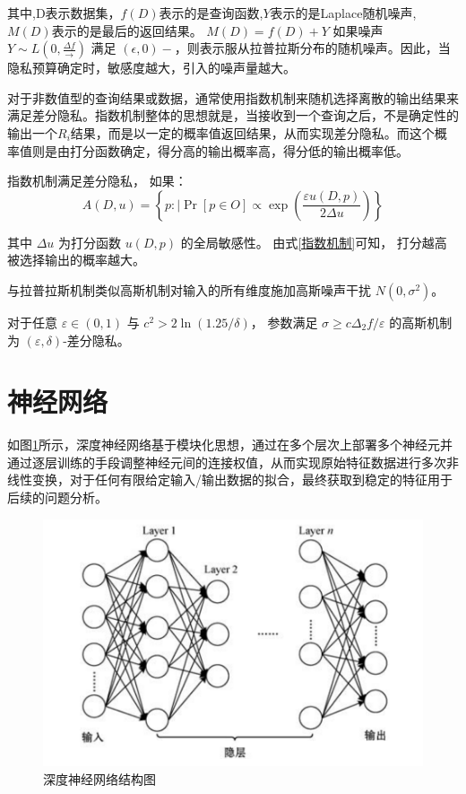 其中,D表示数据集，$f(D)$表示的是查询函数,$Y$表示的是Laplace随机噪声,$M(D)$表示的是最后的返回结果。
$M(D)=f(D)+Y$
如果噪声 $Y \sim L\left(0,\frac{\Delta f}{\longrightarrow}\right)$ 满足 $(\epsilon,0)-$，则表示服从拉普拉斯分布的随机噪声。因此，当隐私预算确定时，敏感度越大，引入的噪声量越大。

对于非数值型的查询结果或数据，通常使用指数机制来随机选择离散的输出结果来满足差分隐私。指数机制整体的思想就是，当接收到一个查询之后，不是确定性的输出一个$R_{i}$结果，而是以一定的概率值返回结果，从而实现差分隐私。而这个概率值则是由打分函数确定，得分高的输出概率高，得分低的输出概率低。

\begin{theorem}[指数机制]\label{指数机制}
指数机制满足差分隐私， 如果：
$$
A(D,u)=\left\{p: \mid \operatorname{Pr}[p \in O] \propto \exp \left(\frac{\varepsilon u(D,p)}{2 \Delta u}\right)\right\}
$$
\end{theorem}
其中 $\Delta u$ 为打分函数 $u(D,p)$ 的全局敏感性。 由式\ref{指数机制}可知， 打分越高被选择输出的概率越大。\cite{53}

与拉普拉斯机制类似高斯机制对输入的所有维度施加高斯噪声干扰 $N\left(0,\sigma^{2}\right)$。
\begin{theorem}[高斯机制]\label{高斯机制}
对于任意 $\varepsilon \in(0,1)$ 与 $c^{2}>2 \ln (1.25 / \delta)$， 参数满足 $\sigma \geq c \Delta_{2} f / \varepsilon$ 的高斯机制为 $(\varepsilon,\delta)$-差分隐私。
\end{theorem}

\section{神经网络}
如图\ref{fig:深度神经网络结构图}所示，深度神经网络基于模块化思想，通过在多个层次上部署多个神经元并通过逐层训练的手段调整神经元间的连接权值，从而实现原始特征数据进行多次非线性变换，对于任何有限给定输入/输出数据的拟合，最终获取到稳定的特征用于后续的问题分析。
\begin{figure}[!hbt]
\centering
	\includegraphics[scale=0.7]{fig2/C2/深度神经网络结构图}%
	\caption{深度神经网络结构图}
	\label{fig:深度神经网络结构图}	
\end{figure}

